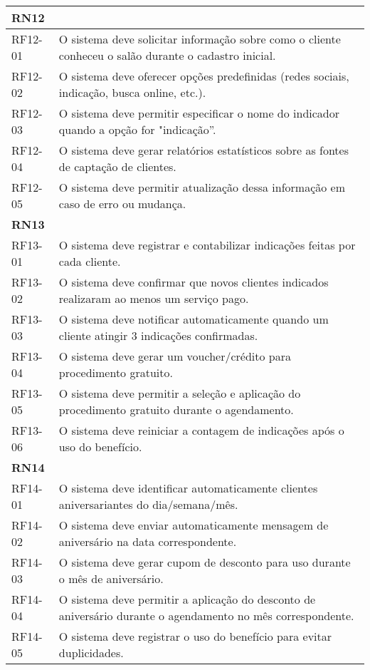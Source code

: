 \begin{longtable}{|p{}|p{}|}
	\multicolumn{2}{|l|}{\textbf{RN12}} \\ \hline
	RF12-01 & O sistema deve solicitar informação sobre como o cliente conheceu o salão durante o cadastro inicial. \\ \hline
	RF12-02 & O sistema deve oferecer opções predefinidas (redes sociais, indicação, busca online, etc.). \\ \hline
	RF12-03 & O sistema deve permitir especificar o nome do indicador quando a opção for "indicação”. \\ \hline
	RF12-04 & O sistema deve gerar relatórios estatísticos sobre as fontes de captação de clientes. \\ \hline
	RF12-05 & O sistema deve permitir atualização dessa informação em caso de erro ou mudança. \\ \hline
	
	\multicolumn{2}{|l|}{\textbf{RN13}} \\ \hline
	RF13-01 & O sistema deve registrar e contabilizar indicações feitas por cada cliente. \\ \hline
	RF13-02 & O sistema deve confirmar que novos clientes indicados realizaram ao menos um serviço pago. \\ \hline
	RF13-03 & O sistema deve notificar automaticamente quando um cliente atingir 3 indicações confirmadas. \\ \hline
	RF13-04 & O sistema deve gerar um voucher/crédito para procedimento gratuito. \\ \hline
	RF13-05 & O sistema deve permitir a seleção e aplicação do procedimento gratuito durante o agendamento. \\ \hline
	RF13-06 & O sistema deve reiniciar a contagem de indicações após o uso do benefício. \\ \hline
		
	\multicolumn{2}{|l|}{\textbf{RN14}} \\ \hline
	RF14-01 & O sistema deve identificar automaticamente clientes aniversariantes do dia/semana/mês. \\ \hline
	RF14-02 & O sistema deve enviar automaticamente mensagem de aniversário na data correspondente. \\ \hline
	RF14-03 & O sistema deve gerar cupom de desconto para uso durante o mês de aniversário. \\ \hline
	RF14-04 & O sistema deve permitir a aplicação do desconto de aniversário durante o agendamento no mês correspondente. \\ \hline
	RF14-05 & O sistema deve registrar o uso do benefício para evitar duplicidades. \\ \hline
	

\end{longtable}
